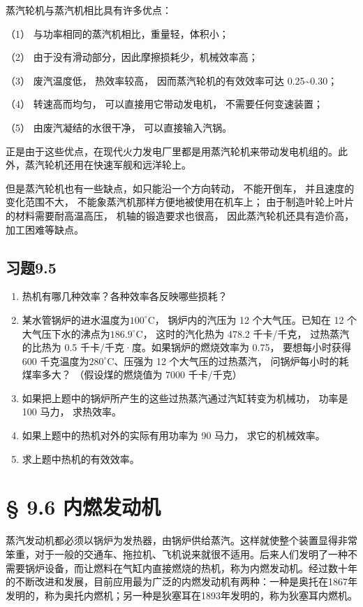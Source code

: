 蒸汽轮机与蒸汽机相比具有许多优点：

（1） 与功率相同的蒸汽机相比，重量轻，体积小；

（2） 由于没有滑动部分，因此摩擦损耗少，机械效率高；

（3） 废汽温度低， 热效率较高， 因而蒸汽轮机的有效效率可达
0.25\textasciitilde0.30；

（4） 转速高而均匀， 可以直接用它带动发电机， 不需要任何变速装置；

（5） 由废汽凝结的水很干净， 可以直接输入汽锅。

正是由于这些优点，在现代火力发电厂里都是用蒸汽轮机来带动发电机组的。此外，蒸汽轮机还用在快速军舰和远洋轮上。

但是蒸汽轮机也有一些缺点，如只能沿一个方向转动， 不能开倒车，
并且速度的变化范围不大， 不能象蒸汽机那样方便地被使用在机车上；
由于制造叶轮上叶片的材料需要耐高温高压， 机轴的锻造要求也很高，
因此蒸汽轮机还具有造价高， 加工困难等缺点。

\subsection{习题9.5}\label{ux4e60ux98989.5}

\begin{enumerate}
\def\labelenumi{\arabic{enumi}.}
\item
  热机有哪几种效率？各种效率各反映哪些损耗？
\item
  某水管锅炉的进水温度为\(100^{\circ} \mathrm{C}\)， 锅炉内的汽压为 12
  个大气压。已知在 12 个大气压下水的沸点为\(186.9^{\circ} \mathrm{C}\)，
  这时的汽化热为 478.2 千卡/千克， 过热蒸汽的比热为 0.5
  千卡/千克·度。如果锅炉的燃烧效率为 0.75， 要想每小时获得 600
  千克温度为\(280^{\circ} \mathrm{C}\)、压强为 12 个大气压的过热蒸汽，
  问锅炉每小时的耗煤率多大？ （假设煤的燃烧值为 7000 千卡/千克）
\item
  如果把上题中的锅炉所产生的这些过热蒸汽通过汽缸转变为机械功， 功率是
  100 马力， 求热效率。
\item
  如果上题中的热机对外的实际有用功率为 90 马力， 求它的机械效率。
\item
  求上题中热机的有效效率。
\end{enumerate}

\section{§ 9.6 内燃发动机}\label{ux5185ux71c3ux53d1ux52a8ux673a}

蒸汽发动机都必须以锅炉为发热器，由锅炉供给蒸汽。这样就使整个装置显得非常笨重，对于一般的交通车、拖拉机、飞机说来就很不适用。后来人们发明了一种不需要锅炉设备，而让燃料在气缸内直接燃烧的热机，称为内燃发动机。经过数十年的不断改进和发展，目前应用最为广泛的内燃发动机有两种：一种是奥托在1867年发明的，称为奥托内燃机；另一种是狄塞耳在1893年发明的，称为狄塞耳内燃机。

